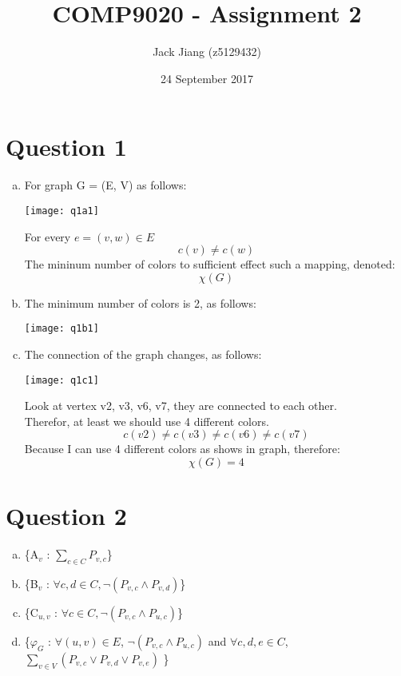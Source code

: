 \documentclass[11pt, a4paper]{article}
\begin{document}
\title{COMP9020 - Assignment 2}
\author{Jack Jiang (z5129432)}
\date{ 24 September 2017 }
\maketitle
\graphicspath{{Graphics/}}

\section*{Question 1}
\begin{enumerate}[(a)]
    \item
    For graph G = (E, V) as follows:
    \begin{center}
        \texttt{[image: q1a1]}
    \end{center}
    For every $e = (v, w) \in E$
    $$ c(v) \ne c(w) $$
    The mininum number of colors to sufficient effect such a mapping, denoted:
    $$ \chi(G) $$
    \item
    The minimum number of colors is 2, as follows:
    \begin{center}
        \texttt{[image: q1b1]}
    \end{center}
    \item
    The connection of the graph changes, as follows:
    \begin{center}
        \texttt{[image: q1c1]}
    \end{center}
    Look at vertex v2, v3, v6, v7, they are connected to each other.\\
    Therefor, at least we should use 4 different colors.\\
    $$c(v2) \ne c(v3) \ne c(v6) \ne c(v7)$$
    Because I can use 4 different colors as shows in graph, therefore:
    $$ \chi(G) = 4 $$
\end{enumerate}

\section*{Question 2}
\begin{enumerate}[(a)]
    \item
    \{A$_v$ :  $ \sum_{c \in C} P_{v, c}$\}
    \item
    \{B$_v$ :  $ \forall c,d \in C, \neg (P_{v, c} \land P_{v, d})$\}
    \item
    \{C$_{u, v}$ :  $ \forall c \in C, \neg (P_{v, c} \land P_{u, c})$\}
    \item
    \{$\varphi_G$ :  $ \forall (u,v) \in E $, $\neg (P_{v, c} \land P_{u, c})$ and $ \forall c,d,e \in C$, $\sum_{v \in V}(P_{v, c} \lor P_{v, d} \lor P_{v, e})$ \}
\end{enumerate}
\end{document}
